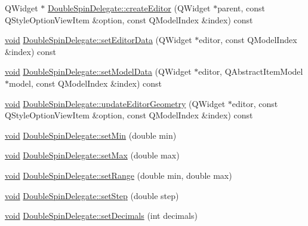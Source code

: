 \begin{DoxyCompactItemize}
\item 
\-Q\-Widget $\ast$ \hyperlink{group___config_plugin_ga33340622f34643415ef4fc706e9a6350}{\-Double\-Spin\-Delegate\-::create\-Editor} (\-Q\-Widget $\ast$parent, const \-Q\-Style\-Option\-View\-Item \&option, const \-Q\-Model\-Index \&index) const 
\item 
\hyperlink{group___u_a_v_objects_plugin_ga444cf2ff3f0ecbe028adce838d373f5c}{void} \hyperlink{group___config_plugin_ga7016b6a15b52b4f03fe882a1ceac795a}{\-Double\-Spin\-Delegate\-::set\-Editor\-Data} (\-Q\-Widget $\ast$editor, const \-Q\-Model\-Index \&index) const 
\item 
\hyperlink{group___u_a_v_objects_plugin_ga444cf2ff3f0ecbe028adce838d373f5c}{void} \hyperlink{group___config_plugin_ga2443d25896b59ae577cfe74ccb2e96c9}{\-Double\-Spin\-Delegate\-::set\-Model\-Data} (\-Q\-Widget $\ast$editor, \-Q\-Abstract\-Item\-Model $\ast$model, const \-Q\-Model\-Index \&index) const 
\item 
\hyperlink{group___u_a_v_objects_plugin_ga444cf2ff3f0ecbe028adce838d373f5c}{void} \hyperlink{group___config_plugin_gaa8fa5b648a223ce46e7ede0d8d2374c1}{\-Double\-Spin\-Delegate\-::update\-Editor\-Geometry} (\-Q\-Widget $\ast$editor, const \-Q\-Style\-Option\-View\-Item \&option, const \-Q\-Model\-Index \&index) const 
\item 
\hyperlink{group___u_a_v_objects_plugin_ga444cf2ff3f0ecbe028adce838d373f5c}{void} \hyperlink{group___config_plugin_ga8fe1a2276b7d458c30d82f206d31eef8}{\-Double\-Spin\-Delegate\-::set\-Min} (double min)
\item 
\hyperlink{group___u_a_v_objects_plugin_ga444cf2ff3f0ecbe028adce838d373f5c}{void} \hyperlink{group___config_plugin_ga0212bd7a414f18e297eef0ab1cbf04ad}{\-Double\-Spin\-Delegate\-::set\-Max} (double max)
\item 
\hyperlink{group___u_a_v_objects_plugin_ga444cf2ff3f0ecbe028adce838d373f5c}{void} \hyperlink{group___config_plugin_ga630d5ced68d6c22fa36f9a37cd704d01}{\-Double\-Spin\-Delegate\-::set\-Range} (double min, double max)
\item 
\hyperlink{group___u_a_v_objects_plugin_ga444cf2ff3f0ecbe028adce838d373f5c}{void} \hyperlink{group___config_plugin_ga42edf13270f2e0292e3a4c41d7e3a1ca}{\-Double\-Spin\-Delegate\-::set\-Step} (double step)
\item 
\hyperlink{group___u_a_v_objects_plugin_ga444cf2ff3f0ecbe028adce838d373f5c}{void} \hyperlink{group___config_plugin_ga11e87a1f2a87beb99eff9abd3ed39c70}{\-Double\-Spin\-Delegate\-::set\-Decimals} (int decimals)
\item 

\end{DoxyCompactItemize}
